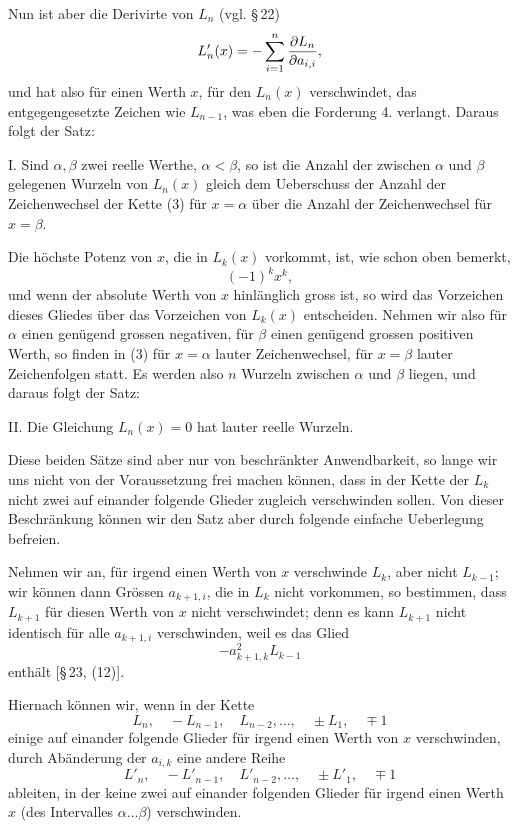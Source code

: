 \documentclass[11pt]{article}
\begin{document}
Nun ist aber die Derivirte von $L_n$ (vgl. \S\,22)
\[
        L'_n(x)=-\sum_{i=1}^{n}{\partial L_n\over\partial a_{i,i}},
\]
und hat also f\"ur einen Werth $x$, f\"ur den $L_n(x)$ verschwindet, das entgegengesetzte Zeichen wie $L_{n-1}$, was eben die Forderung 4. verlangt. Daraus folgt der Satz:

I. Sind $\alpha,\beta$ zwei reelle Werthe, $\alpha<\beta$, so ist die Anzahl der zwischen $\alpha$ und $\beta$ gelegenen Wurzeln von $L_n(x)$ gleich dem Ueberschuss der Anzahl der Zeichenwechsel der Kette (3) f\"ur $x=\alpha$ \"uber die Anzahl der Zeichenwechsel f\"ur $x=\beta$.

Die h\"ochste Potenz von $x$, die in $L_k(x)$ vorkommt, ist, wie schon oben bemerkt,
\[
        (-1)^kx^k,
\]
und wenn der absolute Werth von $x$ hinl\"anglich gross ist, so wird das Vorzeichen dieses Gliedes \"uber das Vorzeichen von $L_k(x)$ entscheiden. Nehmen wir also f\"ur $\alpha$ einen gen\"ugend grossen negativen, f\"ur $\beta$ einen gen\"ugend grossen positiven Werth, so finden in (3) f\"ur $x=\alpha$ lauter Zeichenwechsel, f\"ur $x=\beta$ lauter Zeichenfolgen statt. Es werden also $n$ Wurzeln zwischen $\alpha$ und $\beta$ liegen, und daraus folgt der Satz:

II. Die Gleichung $L_n(x)=0$ hat lauter reelle Wurzeln.

Diese beiden S\"atze sind aber nur von beschr\"ankter Anwendbarkeit, so lange wir uns nicht von der Voraussetzung frei machen k\"onnen, dass in der Kette der $L_k$ nicht zwei auf einander folgende Glieder zugleich verschwinden sollen. Von dieser Beschr\"ankung k\"onnen wir den Satz aber durch folgende einfache Ueberlegung befreien.

Nehmen wir an, f\"ur irgend einen Werth von $x$ verschwinde $L_k$, aber nicht $L_{k-1}$; wir k\"onnen dann Gr\"ossen $a_{k+1,i}$, die in $L_k$ nicht vorkommen, so bestimmen, dass $L_{k+1}$ f\"ur diesen Werth von $x$ nicht verschwindet; denn es kann $L_{k+1}$ nicht identisch f\"ur alle $a_{k+1,i}$ verschwinden, weil es das Glied
\[
        -a_{k+1,k}^2L_{k-1}
\]
enth\"alt [\S\,23, (12)].

Hiernach k\"onnen wir, wenn in der Kette
\begin{equation}
        L_n,
        \quad -L_{n-1},
        \quad L_{n-2},
        \ldots,
        \quad \pm L_1,
        \quad \mp1
\tag{5}
\end{equation}
einige auf einander folgende Glieder f\"ur irgend einen Werth von $x$ verschwinden, durch Ab\"anderung der $a_{i,k}$ eine andere Reihe
\begin{equation}
        L'_n,
        \quad -L'_{n-1},
        \quad L'_{n-2},
        \ldots,
        \quad \pm L'_1,
        \quad \mp1
\tag{6}
\end{equation}
ableiten, in der keine zwei auf einander folgenden Glieder f\"ur irgend einen Werth $x$ (des Intervalles $\alpha\ldots\beta$) verschwinden.
\end{document}
